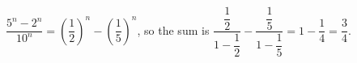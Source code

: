 $\dfrac{5^n-2^n}{10^n}=\left(\dfrac12\right)^n-\left(\dfrac15\right)^n$, so the sum is $\dfrac{\dfrac12}{1-\dfrac12}-\dfrac{\dfrac15}{1-\dfrac15}=1-\dfrac14=\boxed{\dfrac34}$.
